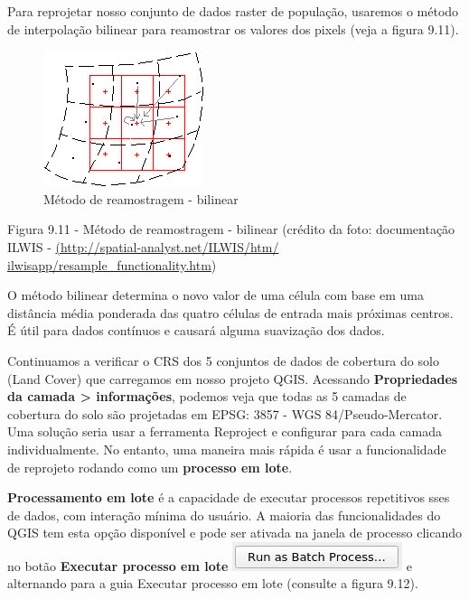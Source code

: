 \documentclass[
]{krantz}
\begin{document}
Para reprojetar nosso conjunto de dados raster de população, usaremos o método de interpolação bilinear para reamostrar os valores dos pixels (veja a figura 9.11).

\begin{figure}
\centering
\includegraphics{media/modulo9/fig911.png}
\caption{Método de reamostragem - bilinear}
\end{figure}

Figura 9.11 - Método de reamostragem - bilinear (crédito da foto: documentação ILWIS - \href{http://spatial-analyst.net/ILWIS/htm/ilwisapp/resample_functionality.htm}{(http://spatial-analyst.net/ILWIS/htm/ ilwisapp/resample\_functionality.htm})

O método bilinear determina o novo valor de uma célula com base em uma distância média ponderada das quatro células de entrada mais próximas centros. É útil para dados contínuos e causará alguma suavização dos dados.

Continuamos a verificar o CRS dos 5 conjuntos de dados de cobertura do solo (Land Cover) que carregamos em nosso projeto QGIS. Acessando \textbf{Propriedades da camada \textgreater{} informações}, podemos veja que todas as 5 camadas de cobertura do solo são projetadas em EPSG: 3857 - WGS 84/Pseudo-Mercator. Uma solução seria usar a ferramenta Reproject e configurar para cada camada individualmente. No entanto, uma maneira mais rápida é usar a funcionalidade de reprojeto rodando como um \textbf{processo em lote}.

\textbf{Processamento em lote} é a capacidade de executar processos repetitivos sses de dados, com interação mínima do usuário. A maioria das funcionalidades do QGIS tem esta opção disponível e pode ser ativada na janela de processo clicando no botão \textbf{Executar processo em lote} \includegraphics{media/modulo9/batch-btn.png} e alternando para a guia Executar processo em lote (consulte a figura 9.12).
\end{document}
